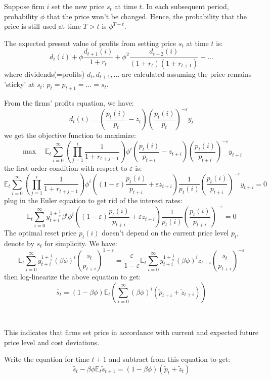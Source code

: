 Suppose firm $i$ set the new price $s_t$ at time $t$.
In each subsequent period, probability $\phi $ that the price won't be changed.
Hence, the probability that the price is still used at time $T>t$ is $\phi^{T-t}$.

The expected present value of profits from setting price $s_t$ at time $t$ is:
\[
d_t(i) + \phi \frac{d_{t+1}(i)}{1+r_t} + \phi^2 \frac{d_{t+2}(i)}{(1+r_t)(1+r_{t+1})} + \ldots
\]
where dividends(=profits) $d_t, d_{t+1}, \ldots$ are calculated assuming the price remains 'sticky' at $s_t$:
$p_t = p_{t+1} = \ldots = s_t.$

From the firms' profits equation, we have:
\[
d_t(i) = \left(\frac{p_t(i)}{p_t} - z_t\right)\left(\frac{p_t(i)}{p_t}\right)^{-\varepsilon}y_t
\]
we get the objective function to maximize:
\[
\max \quad \mathbb{E}_t \sum_{i=0}^{\infty} \left(\prod_{j=1}^{i}\frac{1}{1+r_{t+j-1} }\right) \phi^{i} \left(\frac{p_t(i)}{p_{t+i}} - z_{t+i}\right)\left(\frac{p_t(i)}{p_{t+i}}\right)^{-\varepsilon}y_{t+i}
\]
the first order condition with respect to $\varepsilon$ is:
\[
\mathbb{E}_t \sum_{i=0}^{\infty} \left(\prod_{j=1}^{i}\frac{1}{1+r_{t+j-1} }\right) \phi^{i} \left((1-\varepsilon)\frac{p_t(i)}{p_{t+i}} + \varepsilon z_{t+i}\right) \frac{1}{p_t(i)} \left(\frac{p_t(i)}{p_{t+i}}\right)^{-\varepsilon}y_{t+i} = 0
\]
plug in the Euler equation to get rid of the interest rates:
\[
\mathbb{E}_t \sum_{i=0}^{\infty} y_{t+i}^{1+\frac{1}{\sigma}}  \beta^{i} \phi^{i} \left((1-\varepsilon)\frac{p_t(i)}{p_{t+i}} + \varepsilon z_{t+i}\right) \frac{1}{p_t(i)} \left(\frac{p_t(i)}{p_{t+i}}\right)^{-\varepsilon}= 0
\]
The optimal reset price $p_t(i)$ doesn't depend on the current price level $p_t$, denote by $s_t$ for simplicity.
We have:
\[
\mathbb{E}_t \sum_{i=0}^{\infty} y_{t+i}^{1+\frac{1}{\sigma}} (\beta\phi)^{i} \left(\frac{s_t}{p_{t+i}}\right)^{1-\varepsilon} = \frac{\varepsilon}{1-\varepsilon} \mathbb{E}_t \sum_{i=0}^{\infty} y_{t+i}^{1+\frac{1}{\sigma}} (\beta\phi)^{i} z_{t+i} \left(\frac{s_t}{p_{t+i}}\right)^{-\varepsilon}
\]
then log-linearize the above equation to get:
\[
\tilde{s_t} = (1 - \beta \phi)\mathbb{E}_t\left(\sum_{i=0}^{\infty}(\beta \phi)^i(\tilde{p}_{t+i}+\tilde{z}_{t+i}) \right)
\]

\begin{note}
    \ 

    This indicates that firms set price in accordance with current and expected future price level and cost deviations.
\end{note}

Write the equation for time $t+1$ and subtract from this equation to get:
\[
\tilde{s_t} - \beta \phi\mathbb{E}_t \tilde{s}_{t+1} = (1-\beta \phi)(\tilde{p}_t + \tilde{z}_t)
\]

